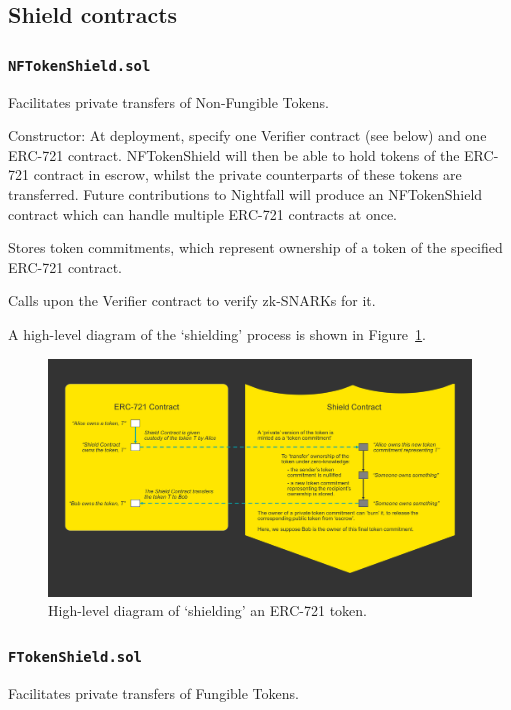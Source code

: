 \subsection{Shield contracts}
\subsubsection{\texttt{NFTokenShield.sol}}
Facilitates private transfers of Non-Fungible Tokens.

Constructor: At deployment, specify one Verifier contract (see below) and one ERC-721 contract. NFTokenShield will then be able to hold tokens of the ERC-721 contract in escrow, whilst the private counterparts of these tokens are transferred. Future contributions to Nightfall will produce an NFTokenShield contract which can handle multiple ERC-721 contracts at once.

Stores token commitments, which represent ownership of a token of the specified ERC-721 contract.

Calls upon the Verifier contract to verify zk-SNARKs for it.

A high-level diagram of the `shielding' process is shown in Figure~\ref{pic:nftShield}.

\begin{figure}[H]
	\begin{center}
		\includegraphics[width=\textwidth]{images/erc721Shielding.png}
	\end{center}
	\caption{High-level diagram of `shielding' an ERC-721 token.}
	\label{pic:nftShield}
\end{figure}

\subsubsection{\texttt{FTokenShield.sol}}
Facilitates private transfers of Fungible Tokens.

